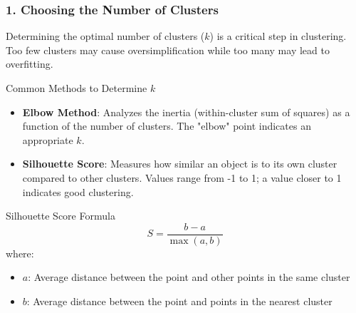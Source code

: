 \documentclass[aspectratio=169]{beamer}
\begin{document}
\begin{frame}[fragile]
  \frametitle{1. Choosing the Number of Clusters}
  Determining the optimal number of clusters ($k$) is a critical step in clustering. Too few clusters may cause oversimplification while too many may lead to overfitting.
  
  \begin{block}{Common Methods to Determine $k$}
    \begin{itemize}
      \item \textbf{Elbow Method}: Analyzes the inertia (within-cluster sum of squares) as a function of the number of clusters. The "elbow" point indicates an appropriate $k$.
      
      \item \textbf{Silhouette Score}: Measures how similar an object is to its own cluster compared to other clusters. Values range from -1 to 1; a value closer to 1 indicates good clustering.
    \end{itemize}
  \end{block}
  
  \begin{block}{Silhouette Score Formula}
    \begin{equation}
    S = \frac{b-a}{\max(a, b)}
    \end{equation}
    where:
    \begin{itemize}
      \item $a$: Average distance between the point and other points in the same cluster
      \item $b$: Average distance between the point and points in the nearest cluster
    \end{itemize}
  \end{block}
\end{frame}
\end{document}
